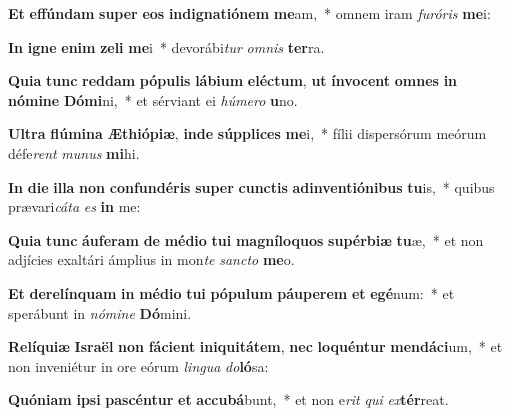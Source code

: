 \item \textbf{Et} \textbf{ef}\textbf{fún}\textbf{dam} \textbf{su}\textbf{per} \textbf{e}\textbf{os} \textbf{in}\textbf{di}\textbf{gna}\textbf{ti}\textbf{ó}\textbf{nem} \textbf{me}am,~* omnem iram \textit{fu}\textit{ró}\textit{ris} \textbf{me}i:
\item \textbf{In} \textbf{i}\textbf{gne} \textbf{e}\textbf{nim} \textbf{ze}\textbf{li} \textbf{me}i~* devorábi\textit{tur} \textit{om}\textit{nis} \textbf{ter}ra.
\item \textbf{Qui}\textbf{a} \textbf{tunc} \textbf{red}\textbf{dam} \textbf{pó}\textbf{pu}\textbf{lis} \textbf{lá}\textbf{bi}\textbf{um} \textbf{e}\textbf{léc}\textbf{tum}, \textbf{ut} \textbf{ín}\textbf{vo}\textbf{cent} \textbf{om}\textbf{nes} \textbf{in} \textbf{nó}\textbf{mi}\textbf{ne} \textbf{Dó}\textbf{mi}ni,~* et sérviant ei \textit{hú}\textit{me}\textit{ro} \textbf{u}no.
\item \textbf{Ul}\textbf{tra} \textbf{flú}\textbf{mi}\textbf{na} \textbf{Æ}\textbf{thi}\textbf{ó}\textbf{pi}\textbf{æ}, \textbf{in}\textbf{de} \textbf{súp}\textbf{pli}\textbf{ces} \textbf{me}i,~* fílii dispersórum meórum défe\textit{rent} \textit{mu}\textit{nus} \textbf{mi}hi.
\item \textbf{In} \textbf{di}\textbf{e} \textbf{il}\textbf{la} \textbf{non} \textbf{con}\textbf{fun}\textbf{dé}\textbf{ris} \textbf{su}\textbf{per} \textbf{cunc}\textbf{tis} \textbf{ad}\textbf{in}\textbf{ven}\textbf{ti}\textbf{ó}\textbf{ni}\textbf{bus} \textbf{tu}is,~* quibus prævari\textit{cá}\textit{ta} \textit{es} \textbf{in} me:
\item \textbf{Qui}\textbf{a} \textbf{tunc} \textbf{áu}\textbf{fe}\textbf{ram} \textbf{de} \textbf{mé}\textbf{di}\textbf{o} \textbf{tu}\textbf{i} \textbf{ma}\textbf{gní}\textbf{lo}\textbf{quos} \textbf{su}\textbf{pér}\textbf{bi}\textbf{æ} \textbf{tu}æ,~* et non adjícies exaltári ámplius in mon\textit{te} \textit{sanc}\textit{to} \textbf{me}o.
\item \textbf{Et} \textbf{de}\textbf{re}\textbf{lín}\textbf{quam} \textbf{in} \textbf{mé}\textbf{di}\textbf{o} \textbf{tu}\textbf{i} \textbf{pó}\textbf{pu}\textbf{lum} \textbf{páu}\textbf{pe}\textbf{rem} \textbf{et} \textbf{e}\textbf{gé}num:~* et sperábunt in \textit{nó}\textit{mi}\textit{ne} \textbf{Dó}mini.
\item \textbf{Re}\textbf{lí}\textbf{qui}\textbf{æ} \textbf{Is}\textbf{ra}\textbf{ël} \textbf{non} \textbf{fá}\textbf{ci}\textbf{ent} \textbf{in}\textbf{i}\textbf{qui}\textbf{tá}\textbf{tem}, \textbf{nec} \textbf{lo}\textbf{quén}\textbf{tur} \textbf{men}\textbf{dá}\textbf{ci}um,~* et non inveniétur in ore eórum \textit{lin}\textit{gua} \textit{do}\textbf{ló}sa:
\item \textbf{Quón}\textbf{i}\textbf{am} \textbf{ip}\textbf{si} \textbf{pa}\textbf{scén}\textbf{tur} \textbf{et} \textbf{ac}\textbf{cu}\textbf{bá}bunt,~* et non e\textit{rit} \textit{qui} \textit{ex}\textbf{tér}reat.
